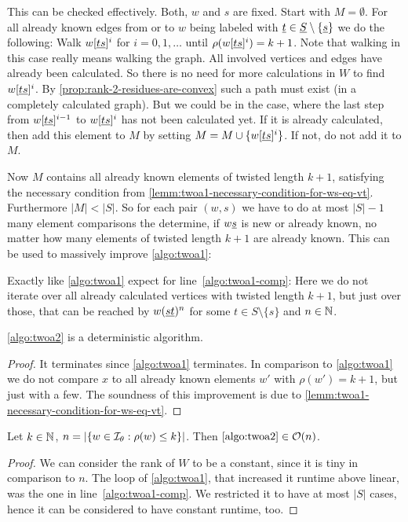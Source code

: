 This can be checked effectively. Both, $w$ and $s$ are fixed. Start with $M = \emptyset$. For all already known edges from or to $w$ being labeled with $\underline{t} \in \underline{S} \setminus \{\underline{s}\}$ we do the following: Walk $w[\underline{t} \underline{s}]^i$ for $i = 0,1,\ldots$ until $\rho(w[\underline{t} \underline{s}]^i) = k + 1$. Note that walking in this case really means walking the graph. All involved vertices and edges have already been calculated. So there is no need for more calculations in $W$ to find $w[\underline{t} \underline{s}]^i$. By \ref{prop:rank-2-residues-are-convex} such a path must exist (in a completely calculated graph). But we could be in the case, where the last step from $w[\underline{t} \underline{s}]^{i-1}$ to $w[\underline{t} \underline{s}]^{i}$ has not been calculated yet. If it is already calculated, then add this element to $M$ by setting $M = M \cup \{ w[\underline{t} \underline{s}]^{i} \}$. If not, do not add it to $M$.

Now $M$ contains all already known elements of twisted length $k+1$, satisfying the necessary condition from \ref{lemm:twoa1-necessary-condition-for-ws-eq-vt}. Furthermore $|M| < |S|$. So for each pair $(w,s)$ we have to do at most $|S|-1$ many element comparisons the determine, if $w \underline{s}$ is new or already known, no matter how many elements of twisted length $k+1$ are already known. This can be used to massively improve \ref{algo:twoa1}:

\begin{algo}[TWOA2]
	Exactly like \ref{algo:twoa1} expect for line~\ref{algo:twoa1-comp}: Here we do not iterate over all already calculated vertices with twisted length $k+1$, but just over those, that can be reached by $w(\underline{s} \underline{t})^n$ for some $t \in S \setminus \{s\}$ and $n \in \mathbb{N}$.
\end{algo}

\begin{lemm}
	\ref{algo:twoa2} is a deterministic algorithm.

	\begin{proof}
		It terminates since \ref{algo:twoa1} terminates. In comparison to \ref{algo:twoa1} we do not compare $x$ to all already known elements $w'$ with $\rho(w') = k+1$, but just with a few. The soundness of this improvement is due to \ref{lemm:twoa1-necessary-condition-for-ws-eq-vt}.
	\end{proof}
\end{lemm}

\begin{lemm}
	Let $k \in \mathbb{N}$, $n = |\{ w \in \mathcal{I}_{\theta} : \rho(w) \leq k \}|$. Then $\ref{algo:twoa2} \in \mathcal{O}(n)$.

	\begin{proof}
		We can consider the rank of $W$ to be a constant, since it is tiny in comparison to $n$. The loop of \ref{algo:twoa1}, that increased it runtime above linear, was the one in line~\ref{algo:twoa1-comp}. We restricted it to have at most $|S|$ cases, hence it can be considered to have constant runtime, too.
	\end{proof}
\end{lemm}

